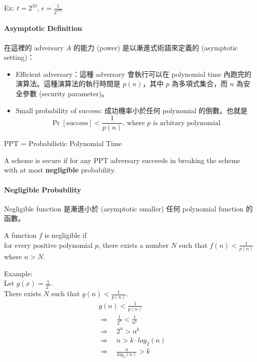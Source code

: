 Ex: \(t = 2^{10}\), \(\epsilon = \displaystyle\frac{1}{2^{100}}\)


\paragraph{Asymptotic Definition}

在這裡的 adversary \(A\) 的能力 (power) 是以漸進式術語來定義的 (asymptotic setting)：
\begin{itemize}
	\item Efficient adversary：這種 adversary 會執行可以在 polynomial time 內跑完的演算法。這種演算法的執行時間是 \(p(n)\)，其中 \(p\) 為多項式集合，而 \(n\) 為安全參數 (security parameter)。
	
	\item Small probability of success: 成功機率小於任何 polynomial 的倒數。也就是
	\[\Pr[\mathrm{success}] < \frac{1}{p(n)} \text{, where } p \text{ is arbitary polynomial}\]
\end{itemize}

PPT = Probabilistic Polynomial Time

\begin{definition}
	A scheme is secure if for any PPT adversary succeeds in breaking the scheme with at most \textbf{negligible} probability.
\end{definition}


\paragraph{Negligible Probability}

Negligible function 是漸進小於 (asymptotic smaller) 任何 polynomial function 的函數。

\begin{definition}
	A function \(f\) is negligible if \\
	for every positive polynomial \(p\), there exists a number \(N\) such that \(f(n) < \displaystyle\frac{1}{p(n)}\) where \(n > N\).
\end{definition}

Example: \\
Let \(g(x) = \displaystyle\frac{1}{2^x}\). \\
There exists \(N\) such that \(g(n) < \displaystyle\frac{1}{p(n)}\). \\
\begin{align*}
	&g(n) < \frac{1}{p(n)} \\
	&\Rightarrow \quad \frac{1}{2^n} < \frac{1}{n^k} \tag{k is positive constant} \\
	&\Rightarrow \quad 2^n > n^k \\
	&\Rightarrow \quad n > k \cdot log_2(n) \\
	&\Rightarrow \quad \frac{n}{log_2(n)} > k
\end{align*}

